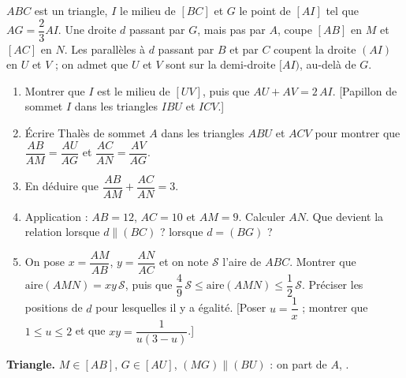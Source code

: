 \documentclass[12pt,a4paper]{article}
\begin{document}
\begin{corr}[title={Une droite par le centre de gravité}, stars=4]
$ABC$ est un triangle, $I$ le milieu de $[BC]$ et $G$ le point de $[AI]$ tel que $AG=\dfrac23AI$. Une droite $d$ passant par $G$, mais pas par $A$, coupe $[AB]$ en $M$ et $[AC]$ en $N$. Les parallèles à $d$ passant par $B$ et par $C$ coupent la droite $(AI)$ en $U$ et $V$ ; on admet que $U$ et $V$ sont sur la demi-droite $[AI)$, au-delà de $G$.

\begin{center}
\end{center}
\begin{enumerate}
  \item Montrer que $I$ est le milieu de $[UV]$, puis que $AU+AV=2\,AI$. [Papillon de sommet $I$ dans les triangles $IBU$ et $ICV$.]
  \item Écrire Thalès de sommet $A$ dans les triangles $ABU$ et $ACV$ pour montrer que $\dfrac{AB}{AM}=\dfrac{AU}{AG}$ et $\dfrac{AC}{AN}=\dfrac{AV}{AG}$.
  \item En déduire que $\dfrac{AB}{AM}+\dfrac{AC}{AN}=3$.
  \item Application : $AB=12$, $AC=10$ et $AM=9$. Calculer $AN$. Que devient la relation lorsque $d\parallel(BC)$ ? lorsque $d=(BG)$ ?
  \item On pose $x=\dfrac{AM}{AB}$, $y=\dfrac{AN}{AC}$ et on note $\mathcal S$ l'aire de $ABC$. Montrer que $\text{aire}(AMN)=xy\,\mathcal S$, puis que $\dfrac49\,\mathcal S\leq\text{aire}(AMN)\leq\dfrac12\,\mathcal S$. Préciser les positions de $d$ pour lesquelles il y a égalité. [Poser $u=\dfrac1x$ ; montrer que $1\leq u\leq2$ et que $xy=\dfrac1{u(3-u)}$.]
\end{enumerate}
\axsol
\begin{prop}
\textbf{Triangle.} $M\in[AB]$, $G\in[AU]$, $(MG)\parallel(BU)$ : on part de $A$, .


\end{prop}
\end{corr}
\end{document}
